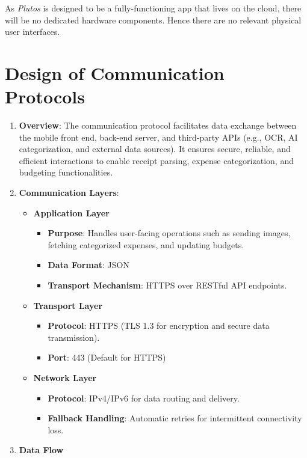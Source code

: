 \documentclass[12pt, titlepage]{article}
\begin{document}
\noindent As \textit{Plutos} is designed to be a fully-functioning app that lives on the cloud, there will be no dedicated hardware components. Hence there are no relevant physical user interfaces.

\section{Design of Communication Protocols}

\begin{enumerate}
	\item \textbf{Overview}: The communication protocol facilitates data exchange between the mobile front end, back-end server, and third-party APIs (e.g., OCR, AI categorization, and external data sources). It ensures secure, reliable, and efficient interactions to enable receipt parsing, expense categorization, and budgeting functionalities.
	\item \textbf{Communication Layers}:
	\begin{itemize}
		\item \textbf{Application Layer}
		\begin{itemize}
			\item \textbf{Purpose}: Handles user-facing operations such as sending images, fetching categorized expenses, and updating budgets.
			\item \textbf{Data Format}: JSON
			\item \textbf{Transport Mechanism}: HTTPS over RESTful API endpoints.
		\end{itemize}
		\item \textbf{Transport Layer}
		\begin{itemize}
			\item \textbf{Protocol}: HTTPS (TLS 1.3 for encryption and secure data transmission).
			\item \textbf{Port}: 443 (Default for HTTPS)
		\end{itemize}
		\item \textbf{Network Layer}
		\begin{itemize}
			\item \textbf{Protocol}: IPv4/IPv6 for data routing and delivery.
			\item \textbf{Fallback Handling}: Automatic retries for intermittent connectivity loss.
		\end{itemize}
	\end{itemize}
	\item \textbf{Data Flow}
	\begin{itemize}

\end{itemize}
\end{enumerate}
\end{document}
